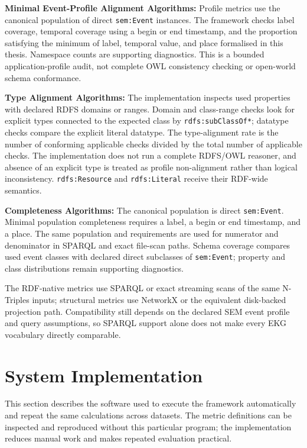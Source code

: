 \textbf{Minimal Event-Profile Alignment Algorithms:} Profile metrics use the canonical population of direct \texttt{sem:Event} instances. The framework checks label coverage, temporal coverage using a begin or end timestamp, and the proportion satisfying the minimum of label, temporal value, and place formalised in this thesis. Namespace counts are supporting diagnostics. This is a bounded application-profile audit, not complete OWL consistency checking or open-world schema conformance.

\textbf{Type Alignment Algorithms:} The implementation inspects used properties with declared RDFS domains or ranges. Domain and class-range checks look for explicit types connected to the expected class by \texttt{rdfs:subClassOf*}; datatype checks compare the explicit literal datatype. The type-alignment rate is the number of conforming applicable checks divided by the total number of applicable checks. The implementation does not run a complete RDFS/OWL reasoner, and absence of an explicit type is treated as profile non-alignment rather than logical inconsistency. \texttt{rdfs:Resource} and \texttt{rdfs:Literal} receive their RDF-wide semantics.

\textbf{Completeness Algorithms:} The canonical population is direct \texttt{sem:Event}. Minimal population completeness requires a label, a begin or end timestamp, and a place. The same population and requirements are used for numerator and denominator in SPARQL and exact file-scan paths. Schema coverage compares used event classes with declared direct subclasses of \texttt{sem:Event}; property and class distributions remain supporting diagnostics.

The RDF-native metrics use SPARQL or exact streaming scans of the same N-Triples inputs; structural metrics use NetworkX or the equivalent disk-backed projection path. Compatibility still depends on the declared SEM event profile and query assumptions, so SPARQL support alone does not make every EKG vocabulary directly comparable.

\section{System Implementation}

This section describes the software used to execute the framework automatically and repeat the same calculations across datasets. The metric definitions can be inspected and reproduced without this particular program; the implementation reduces manual work and makes repeated evaluation practical.

